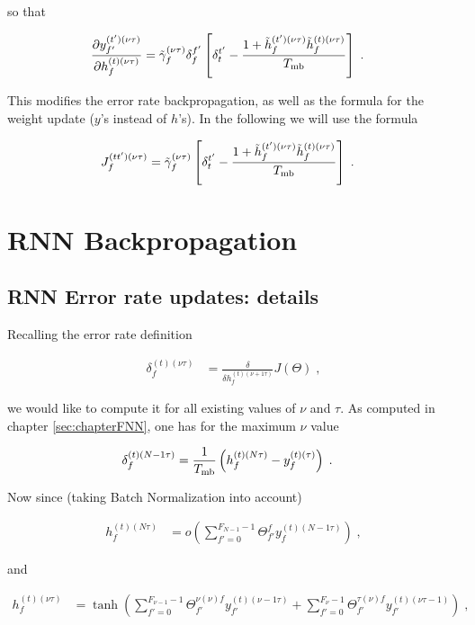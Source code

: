 \begin{subappendices}
so that

\begin{align}
\frac{\partial y_{f'}^{(t')(\nu\tau)}}{\partial h_{f}^{(t)(\nu\tau)}}&=
%
\tilde{\gamma}^{(\nu\tau)}_f \delta^{f'}_f\left[\delta^{t'}_t-
%
\frac{1+\tilde{h}_{f}^{(t')(\nu\tau)}\tilde{h}_{f}^{(t)(\nu\tau)}}{T_{{\rm mb}}}\right]\;.
\end{align}

This modifies the error rate backpropagation, as well as the formula for the weight update ($y$'s instead of $h$'s). In the following we will use the formula

\begin{align}
J^{(tt')(\nu\tau)}_{f}&=
%
\tilde{\gamma}^{(\nu\tau)}_f \left[\delta^{t'}_t-
%
\frac{1+\tilde{h}_{f}^{(t')(\nu\tau)}\tilde{h}_{f}^{(t)(\nu\tau)}}{T_{{\rm mb}}}\right]\;.
\end{align}


\section{RNN Backpropagation}

\subsection{RNN Error rate updates: details} \label{sec:rnnappenderrorrate}

Recalling the error rate definition

\begin{align}
\delta^{(t)( \nu\tau)}_f&=\frac{\delta}{\delta h^{(t)( \nu+1\tau)}_f }J(\Theta)\;,
\end{align}

we would like to compute it for all existing values of $\nu$ and $\tau$. As computed in chapter \ref{sec:chapterFNN}, one has for the maximum $\nu$ value

\begin{align}
\delta^{(t)(N-1\tau)}_f&= \frac{1}{T_{{\rm mb}}}\left(h_{f}^{(t)(N\tau)}-y_f^{(t)(\tau)}\right)\;.
\end{align}

Now since (taking Batch Normalization into account)

\begin{align}
h^{(t)(N\tau)}_{f}&=o\left(\sum_{f'=0}^{F_{N-1}-1}\Theta^f_{f'} y^{(t)(N-1\tau)}_{f}\right)\;,
\end{align}

and

\begin{align}
h^{(t)(\nu\tau)}_f&=\tanh\left(\sum_{f'=0}^{F_{{\nu-1}}-1}\Theta^{\nu(\nu)f}_{f'}
%
y^{(t)(\nu-1\tau)}_{f'}+\sum_{f'=0}^{F_{{\nu}}-1}\Theta^{\tau(\nu)f}_{f'}
%
y^{(t)(\nu\tau-1)}_{f'}\right)\;,
\end{align}


\end{subappendices}
